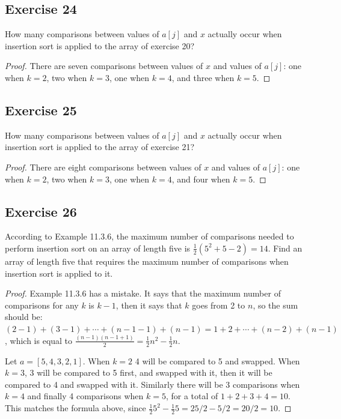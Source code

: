 \documentclass[14pt]{extarticle}
\newcommand{\dps}{\displaystyle}
\begin{document}
\subsection{Exercise 24}
How many comparisons between values of \(a[j]\) and \(x\) actually occur when insertion sort is applied to the array of 
exercise 20?

\begin{proof}
There are seven comparisons between values of \(x\) and values of \(a[j]\): one when \(k = 2\), two when \(k = 3\), one when 
\(k = 4\), and three when \(k = 5\).
\end{proof}

\subsection{Exercise 25}
How many comparisons between values of \(a[j]\) and \(x\) actually occur when insertion sort is applied to the array of 
exercise 21?

\begin{proof}
There are eight comparisons between values of \(x\) and values of \(a[j]\): one when \(k = 2\), two when \(k = 3\), one when 
\(k = 4\), and four when \(k = 5\).
\end{proof}

\subsection{Exercise 26}
According to Example 11.3.6, the maximum number of comparisons needed to perform insertion sort on an array of length five is 
\(\frac{1}{2}(5^2 + 5 - 2) = 14\). Find an array of length five that requires the maximum number of comparisons when 
insertion sort is applied to it.

\begin{proof}
Example 11.3.6 has a mistake. It says that the maximum number of comparisons for any \(k\) is \(k-1\), then it says that 
\(k\) goes from 2 to \(n\), so the sum should be: \((2-1) + (3-1) + \cdots + (n-1-1) + (n-1) = 1+2+\cdots+(n-2)+(n-1)\),
which is equal to \(\dps\frac{(n-1)(n-1+1)}{2} = \frac{1}{2}n^2 - \frac{1}{2}n\).

Let \(a = [5,4,3,2,1]\). When \(k=2\) 4 will be compared to 5 and swapped. When \(k=3\), 3 will be compared to 5 first, and
swapped with it, then it will be compared to 4 and swapped with it. Similarly there will be 3 comparisons when \(k=4\)
and finally 4 comparisons when \(k=5\), for a total of \(1+2+3+4 = 10\). This matches the formula above, since 
\(\dps\frac{1}{2}5^2 - \frac{1}{2}5 = 25/2 - 5/2 = 20/2= 10\).
\end{proof}
\end{document}
